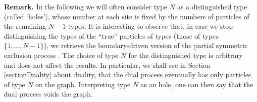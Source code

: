 \documentclass[10pt]{article}
\numberwithin{equation}{section}
\numberwithin{equation}{subsection}
\begin{document}
\vspace{.5cm}
\noindent
{\bf Remark.} In the following we will often consider type $N$ as a distinguished type
(called `holes'), whose number at each site is fixed by the numbers of particles 
of the remaining $N-1$ types. It is interesting to observe that, in case we stop distinguishing the types of the ``true'' particles of types 
(those of types $\{1,\ldots,N-1\}$), we retrieve the 
boundary-driven version of the partial symmetric exclusion process \cite{schutzSandow,carinci2013duality}.
The choice of type $N$ for the distinguished type is arbitrary and does not affect
the results. In particular, we shall see in Section \ref{sectionDuality} about duality, that
the dual process eventually has only particles of type $N$ on the graph.
Interpreting type $N$ as an hole, one can then say that the dual process voids the graph.  
\end{document}
